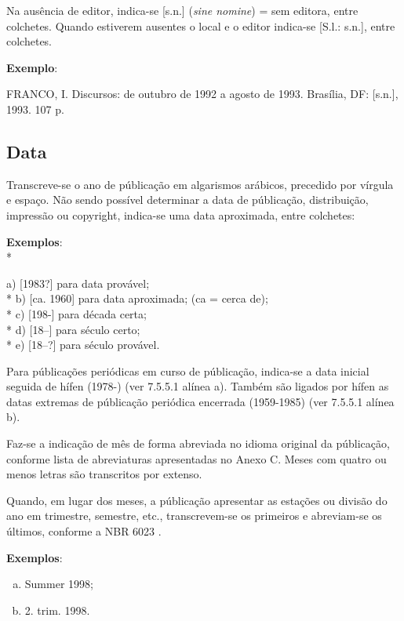 Na ausência de editor, indica-se [s.n.] (\textit{sine nomine}) = sem editora, entre colchetes. Quando estiverem ausentes o local e o editor indica-se [S.l.: s.n.], entre colchetes.

\begin{exemplomanual}
\textbf{Exemplo}:\\
\begin{singlespace}
FRANCO, I. Discursos: de outubro de 1992 a agosto de 1993. Brasília, DF: [s.n.], 1993. 107 p.
\end{singlespace}
\end{exemplomanual}


\subsection{Data}

Transcreve-se o ano de públicação em algarismos arábicos, precedido por vírgula e espaço. Não sendo possível determinar a data de públicação, distribuição, impressão ou copyright, indica-se uma data aproximada, entre colchetes:

\begin{exemplomanual}
\textbf{Exemplos}:\\*

a) [1983?] para data provável;\\*
b) [ca. 1960] para data aproximada; (ca = cerca de);\\*
c) [198-] para década certa;\\*
d) [18--] para século certo;\\*
e) [18--?] para século provável.
\end{exemplomanual}

Para públicações periódicas em curso de públicação, indica-se a data inicial seguida de hífen (1978-) (ver 7.5.5.1 alínea a). Também são ligados por hífen as datas extremas de públicação periódica encerrada (1959-1985) (ver 7.5.5.1 alínea b).

Faz-se a indicação de mês de forma abreviada no idioma original da públicação, conforme lista de abreviaturas apresentadas no Anexo C. Meses com quatro ou menos letras são transcritos por extenso.

Quando, em lugar dos meses, a públicação apresentar as estações ou divisão do ano em trimestre, semestre, etc., transcrevem-se os primeiros e abreviam-se os últimos, conforme a NBR 6023 \cite{NBR6023:2002}.

\begin{exemplomanual}
\textbf{Exemplos}:

\begin{enumerate}[a)]
  \item  Summer 1998;
  \item  2. trim. 1998.
\end{enumerate}
\end{exemplomanual}

